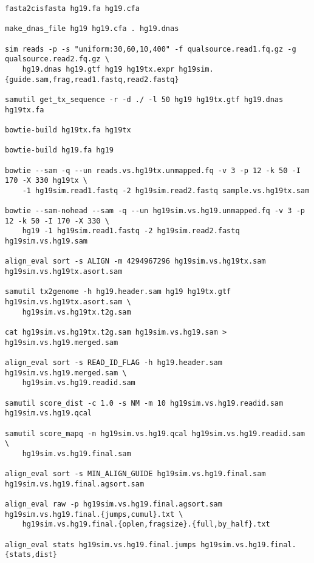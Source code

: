 \documentclass[10pt]{article}
\begin{document}
{\small
\begin{verbatim}
fasta2cisfasta hg19.fa hg19.cfa

make_dnas_file hg19 hg19.cfa . hg19.dnas

sim reads -p -s "uniform:30,60,10,400" -f qualsource.read1.fq.gz -g qualsource.read2.fq.gz \
    hg19.dnas hg19.gtf hg19 hg19tx.expr hg19sim.{guide.sam,frag,read1.fastq,read2.fastq}

samutil get_tx_sequence -r -d ./ -l 50 hg19 hg19tx.gtf hg19.dnas hg19tx.fa

bowtie-build hg19tx.fa hg19tx

bowtie-build hg19.fa hg19

bowtie --sam -q --un reads.vs.hg19tx.unmapped.fq -v 3 -p 12 -k 50 -I 170 -X 330 hg19tx \ 
    -1 hg19sim.read1.fastq -2 hg19sim.read2.fastq sample.vs.hg19tx.sam

bowtie --sam-nohead --sam -q --un hg19sim.vs.hg19.unmapped.fq -v 3 -p 12 -k 50 -I 170 -X 330 \
    hg19 -1 hg19sim.read1.fastq -2 hg19sim.read2.fastq hg19sim.vs.hg19.sam

align_eval sort -s ALIGN -m 4294967296 hg19sim.vs.hg19tx.sam hg19sim.vs.hg19tx.asort.sam

samutil tx2genome -h hg19.header.sam hg19 hg19tx.gtf hg19sim.vs.hg19tx.asort.sam \
    hg19sim.vs.hg19tx.t2g.sam

cat hg19sim.vs.hg19tx.t2g.sam hg19sim.vs.hg19.sam > hg19sim.vs.hg19.merged.sam

align_eval sort -s READ_ID_FLAG -h hg19.header.sam hg19sim.vs.hg19.merged.sam \
    hg19sim.vs.hg19.readid.sam

samutil score_dist -c 1.0 -s NM -m 10 hg19sim.vs.hg19.readid.sam hg19sim.vs.hg19.qcal

samutil score_mapq -n hg19sim.vs.hg19.qcal hg19sim.vs.hg19.readid.sam \
    hg19sim.vs.hg19.final.sam

align_eval sort -s MIN_ALIGN_GUIDE hg19sim.vs.hg19.final.sam hg19sim.vs.hg19.final.agsort.sam

align_eval raw -p hg19sim.vs.hg19.final.agsort.sam hg19sim.vs.hg19.final.{jumps,cumul}.txt \
    hg19sim.vs.hg19.final.{oplen,fragsize}.{full,by_half}.txt

align_eval stats hg19sim.vs.hg19.final.jumps hg19sim.vs.hg19.final.{stats,dist}
\end{verbatim}
}
\end{document}
